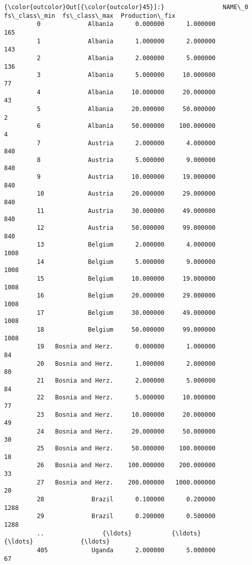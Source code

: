 \documentclass[11pt]{article}
\begin{document}
            \begin{Verbatim}[commandchars=\\\{\}]
{\color{outcolor}Out[{\color{outcolor}45}]:}                NAME\_0  fs\_class\_min  fs\_class\_max  Production\_fix
         0             Albania      0.000000      1.000000             165
         1             Albania      1.000000      2.000000             143
         2             Albania      2.000000      5.000000             136
         3             Albania      5.000000     10.000000              77
         4             Albania     10.000000     20.000000              43
         5             Albania     20.000000     50.000000               2
         6             Albania     50.000000    100.000000               4
         7             Austria      2.000000      4.000000             840
         8             Austria      5.000000      9.000000             840
         9             Austria     10.000000     19.000000             840
         10            Austria     20.000000     29.000000             840
         11            Austria     30.000000     49.000000             840
         12            Austria     50.000000     99.000000             840
         13            Belgium      2.000000      4.000000            1008
         14            Belgium      5.000000      9.000000            1008
         15            Belgium     10.000000     19.000000            1008
         16            Belgium     20.000000     29.000000            1008
         17            Belgium     30.000000     49.000000            1008
         18            Belgium     50.000000     99.000000            1008
         19   Bosnia and Herz.      0.000000      1.000000              84
         20   Bosnia and Herz.      1.000000      2.000000              80
         21   Bosnia and Herz.      2.000000      5.000000              84
         22   Bosnia and Herz.      5.000000     10.000000              77
         23   Bosnia and Herz.     10.000000     20.000000              49
         24   Bosnia and Herz.     20.000000     50.000000              30
         25   Bosnia and Herz.     50.000000    100.000000              18
         26   Bosnia and Herz.    100.000000    200.000000              33
         27   Bosnia and Herz.    200.000000   1000.000000              20
         28             Brazil      0.100000      0.200000            1288
         29             Brazil      0.200000      0.500000            1288
         ..                {\ldots}           {\ldots}           {\ldots}             {\ldots}
         405            Uganda      2.000000      5.000000              67

\end{Verbatim}
\end{document}
